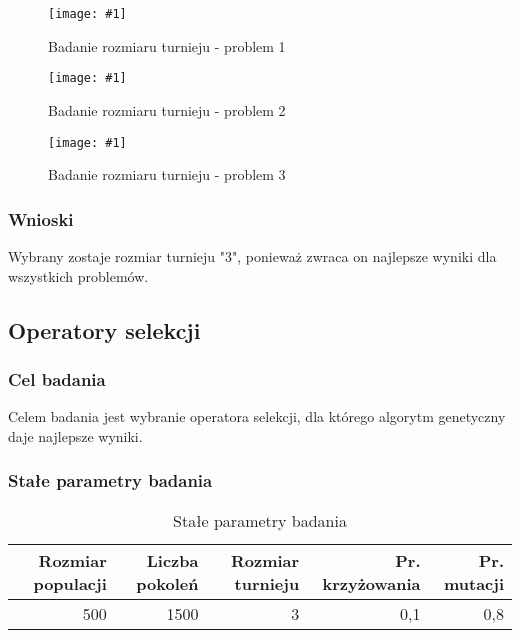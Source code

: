 \documentclass[12pt,a4paper]{article}
\newcommand{\image}[2] {
    \begin{figure}[H]
        \begin{center}
            \texttt{[image: \#1]}
        \end{center}
        \caption{#2}
        \label{#1}
    \end{figure}
}
\begin{document}
\image{images/Badanie rozmiaru turnieju_1}{Badanie rozmiaru turnieju - problem 1}
\image{images/Badanie rozmiaru turnieju_2}{Badanie rozmiaru turnieju - problem 2}
\image{images/Badanie rozmiaru turnieju_3}{Badanie rozmiaru turnieju - problem 3}
\subsubsection{Wnioski}
Wybrany zostaje rozmiar turnieju "3", ponieważ zwraca on najlepsze wyniki dla wszystkich problemów.

\subsection{Operatory selekcji}
\subsubsection{Cel badania}
Celem badania jest wybranie operatora selekcji, dla którego algorytm genetyczny daje najlepsze wyniki.

\subsubsection{Stałe parametry badania}
\begin{table}[htbp]
  \centering
    \begin{tabular}{rrrrr}
    \multicolumn{1}{p{4.215em}}{\textbf{Rozmiar populacji}} & \multicolumn{1}{p{4.215em}}{\textbf{Liczba pokoleń}} & \multicolumn{1}{p{4.215em}}{\textbf{Rozmiar turnieju}} & \multicolumn{1}{p{6.145em}}{\textbf{Pr. krzyżowania}} & \multicolumn{1}{p{4.215em}}{\textbf{Pr. mutacji}} \\
    \midrule
    500   & 1500  & 3     & 0,1   & 0,8 \\
    \end{tabular}%
  \caption{Stałe parametry badania}
  \label{tab:addlabel}%
\end{table}%
\end{document}
